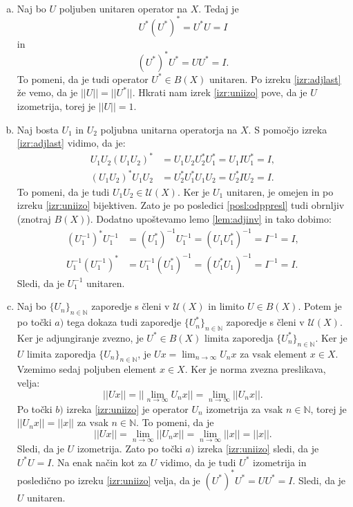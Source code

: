 \documentclass[12pt,a4paper,oneside,fleqn,openany]{book}
\newcommand{\eopf}{\raisebox{0.8ex}{\framebox{}}} %
\newenvironment{dokaz}%
{\noindent{\bf Dokaz.}\ }%
{\hfill\eopf\par\bigskip}%
\newcommand{\N}{\mathbb{N}}
\newcommand{\abs}[1]{\ensuremath{\lvert #1 \rvert}}
\newcommand{\norm}[1]{\abs{\abs{#1}}}
\begin{document}
\begin{dokaz}
	\begin{enumerate}[a)]
		\item Naj bo $U$ poljuben unitaren operator na $X$. Tedaj je $$U^*(U^*)^* = U^*U = I$$ in $$(U^*)^*U^* = UU^* = I.$$ To pomeni, da je tudi operator $U^*\in B(X)$ unitaren. Po izreku \ref{izr:adjlast} že vemo, da je $\norm{U} = \norm{U^*}$. Hkrati nam izrek \ref{izr:uniizo} pove, da je $U$ izometrija, torej je $\norm{U} = 1$.
		\item Naj bosta $U_1$ in $U_2$ poljubna unitarna operatorja na $X$. S pomočjo izreka \ref{izr:adjlast} vidimo, da je: \begin{align*}
			U_1U_2(U_1U_2)^* &= U_1U_2U_2^*U_1^* = U_1IU_1^* = I, \\
			(U_1U_2)^*U_1U_2 &= U_2^*U_1^*U_1U_2 = U_2^*IU_2 = I.
		\end{align*} To pomeni, da je tudi $U_1U_2 \in \mathcal{U}(X)$.
		Ker je $U_1$ unitaren, je omejen in po izreku \ref{izr:uniizo} bijektiven. Zato je po posledici \ref{posl:odppresl} tudi obrnljiv (znotraj $B(X)$). Dodatno upoštevamo lemo \ref{lem:adjinv} in tako dobimo: \begin{align*}
			(U_1^{-1})^*U_1^{-1} &= (U_1^*)^{-1}U_1^{-1} = (U_1U_1^*)^{-1} = I^{-1} = I, \\
			U_1^{-1}(U_1^{-1})^* &= U_1^{-1}(U_1^*)^{-1} = (U_1^*U_1)^{-1} = I^{-1} = I.
		\end{align*}
		Sledi, da je $U_1^{-1}$ unitaren.
		\item Naj bo $\{U_n\}_{n\in\N}$ zaporedje s členi v $\mathcal{U}(X)$ in limito $U \in B(X)$. Potem je po točki $a)$ tega dokaza tudi zaporedje $\{U_n^*\}_{n\in\N}$ zaporedje s členi v $\mathcal{U}(X)$. Ker je adjungiranje zvezno, je $U^*\in B(X)$ limita zaporedja $\{U_n^*\}_{n\in\N}$. Ker je $U$ limita zaporedja $\{U_n\}_{n\in\N}$, je $Ux = \lim_{n\to\infty}U_nx$ za vsak element $x\in X$. Vzemimo sedaj poljuben element $x\in X$. Ker je norma zvezna preslikava, velja: $$\norm{Ux} = \norm{\lim_{n\to\infty}U_nx} = \lim_{n\to\infty}\norm{U_nx}.$$ Po točki $b)$ izreka \ref{izr:uniizo} je operator $U_n$ izometrija za vsak $n\in\N$, torej je $\norm{U_nx} = \norm{x}$ za vsak $n\in\N$. To pomeni, da je $$\norm{Ux} = \lim_{n\to\infty}\norm{U_nx} = \lim_{n\to\infty}\norm{x} = \norm{x}.$$ Sledi, da je $U$ izometrija. Zato po točki $a)$ izreka \ref{izr:uniizo} sledi, da je $U^*U = I$. Na enak način kot za $U$ vidimo, da je tudi $U^*$ izometrija in posledično po izreku \ref{izr:uniizo} velja, da je $(U^*)^*U^* = UU^* = I$. Sledi, da je $U$ unitaren.
	\end{enumerate}
\end{dokaz}
\end{document}
